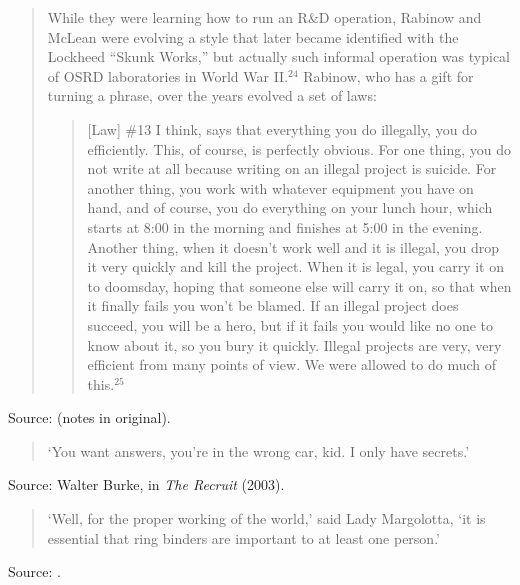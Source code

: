 \documentclass[a4paper]{article}
\begin{document}
\begin{quotation}
	While they were learning how to run an R\&D operation, Rabinow and McLean were evolving a style
that later became identified with the Lockheed ``Skunk Works,'' but actually such informal
operation was typical of OSRD laboratories in World War II.$^{24}$  Rabinow, who has a gift for
turning a phrase, over the years evolved a set of laws:
	\begin{quote}
		[Law] \#13 I think, says that everything you do illegally, you do efficiently.  This, of
		course, is perfectly obvious.  For one thing, you do not write at all because writing on
		an illegal project is suicide.  For another thing, you work with whatever equipment you
		have on hand, and of course, you do everything on your lunch hour, which starts at 8:00 in
		the morning and finishes at 5:00 in the evening.  Another thing, when it doesn't work well
		and it is illegal, you drop it very quickly and kill the project.  When it is legal, you
		carry it on to doomsday, hoping that someone else will carry it on, so that when it finally
		fails you won't be blamed.  If an illegal project does succeed, you will be a hero, but if
		it fails you would like no one to know about it, so you bury it quickly.  Illegal projects
		are very, very efficient from many points of view.  We were allowed to do much of
		this.$^{25}$
	\end{quote}
\end{quotation}
Source: \cite[pp.~12--13]{Westrum1999} (notes in original).
\medskip

\begin{quote}
	`You want answers, you're in the wrong car, kid.  I only have secrets.'
\end{quote}
Source: Walter Burke, in \emph{The Recruit} (2003).
\medskip

\begin{quote}
	`Well, for the proper working of the world,' said Lady Margolotta, `it is essential that ring
binders are important to at least one person.'
\end{quote}
Source: \cite[p.~406]{Pratchett2009}.
\medskip
\end{document}

